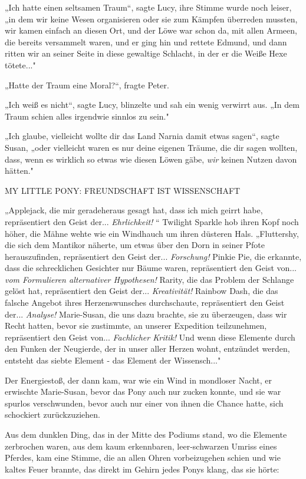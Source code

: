 {„Ich hatte einen seltsamen Traum“, sagte Lucy, ihre Stimme wurde noch leiser, „in dem wir keine Wesen organisieren oder sie zum Kämpfen überreden mussten, wir kamen einfach an diesen Ort, und der Löwe war schon da, mit allen Armeen, die bereits versammelt waren, und er ging hin und rettete Edmund, und dann ritten wir an seiner Seite in diese gewaltige Schlacht, in der er die Weiße Hexe tötete..."

„Hatte der Traum eine Moral?“, fragte Peter.

„Ich weiß es nicht“, sagte Lucy, blinzelte und sah ein wenig verwirrt aus. „In dem Traum schien alles irgendwie sinnlos zu sein."

„Ich glaube, vielleicht wollte dir das Land Narnia damit etwas sagen“, sagte Susan, „oder vielleicht waren es nur deine eigenen Träume, die dir sagen wollten, dass, wenn es wirklich so etwas wie diesen Löwen gäbe, \emph{wir} keinen Nutzen davon hätten."

MY LITTLE PONY: FREUNDSCHAFT IST WISSENSCHAFT

„Applejack, die mir geradeheraus gesagt hat, dass ich mich geirrt habe, repräsentiert den Geist der... \emph{Ehrlichkeit!} “ Twilight Sparkle hob ihren Kopf noch höher, die Mähne wehte wie ein Windhauch um ihren düsteren Hals. „Fluttershy, die sich dem Mantikor näherte, um etwas über den Dorn in seiner Pfote herauszufinden, repräsentiert den Geist der... \emph{Forschung!} Pinkie Pie, die erkannte, dass die schrecklichen Gesichter nur Bäume waren, repräsentiert den Geist von... \emph{vom Formulieren alternativer Hypothesen!} Rarity, die das Problem der Schlange gelöst hat, repräsentiert den Geist der... \emph{Kreativität!} Rainbow Dash, die das falsche Angebot ihres Herzenswunsches durchschaute, repräsentiert den Geist der... \emph{Analyse!} Marie-Susan, die uns dazu brachte, sie zu überzeugen, dass wir Recht hatten, bevor sie zustimmte, an unserer Expedition teilzunehmen, repräsentiert den Geist von... \emph{Fachlicher Kritik!} Und wenn diese Elemente durch den Funken der Neugierde, der in unser aller Herzen wohnt, entzündet werden, entsteht das siebte Element - das Element der Wissensch..."

Der Energiestoß, der dann kam, war wie ein Wind in mondloser Nacht, er erwischte Marie-Susan, bevor das Pony auch nur zucken konnte, und sie war spurlos verschwunden, bevor auch nur einer von ihnen die Chance hatte, sich schockiert zurückzuziehen.

Aus dem dunklen Ding, das in der Mitte des Podiums stand, wo die Elemente zerbrochen waren, aus dem kaum erkennbaren, leer-schwarzen Umriss eines Pferdes, kam eine Stimme, die an allen Ohren vorbeizugehen schien und wie kaltes Feuer brannte, das direkt im Gehirn jedes Ponys klang, das sie hörte:

}
